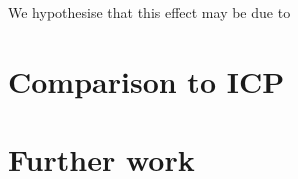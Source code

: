 \documentclass[authoryearcitations]{UoYCSproject}
\begin{document}
We hypothesise that this effect may be due to 





\section{Comparison to ICP}





\section{Further work}


\end{document}

